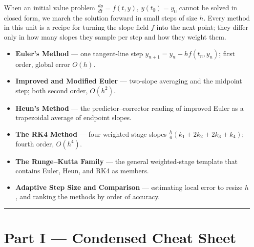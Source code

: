 \begin{topicsbox}
When an initial value problem $\frac{dy}{dt}=f(t,y),\ y(t_0)=y_0$ cannot be
solved in closed form, we march the solution forward in small steps of size $h$.
Every method in this unit is a recipe for turning the slope field $f$ into the
next point; they differ only in how many slopes they sample per step and how they
weight them.
\begin{itemize}[leftmargin=1.4em, itemsep=3pt]
    \item \textbf{Euler's Method} --- one tangent-line step
          $y_{n+1}=y_n+hf(t_n,y_n)$; first order, global error $O(h)$.
    \item \textbf{Improved and Modified Euler} --- two-slope averaging and the
          midpoint step; both second order, $O(h^{2})$.
    \item \textbf{Heun's Method} --- the predictor--corrector reading of improved
          Euler as a trapezoidal average of endpoint slopes.
    \item \textbf{The RK4 Method} --- four weighted stage slopes
          $\tfrac{h}{6}(k_1+2k_2+2k_3+k_4)$; fourth order, $O(h^{4})$.
    \item \textbf{The Runge--Kutta Family} --- the general weighted-stage template
          that contains Euler, Heun, and RK4 as members.
    \item \textbf{Adaptive Step Size and Comparison} --- estimating local error to
          resize $h$, and ranking the methods by order of accuracy.
\end{itemize}
\end{topicsbox}

\vspace{0.6em}
\hrule
\vspace{0.6em}

{}
\section*{Part I --- Condensed Cheat Sheet}
\setcounter{section}{5}   %

